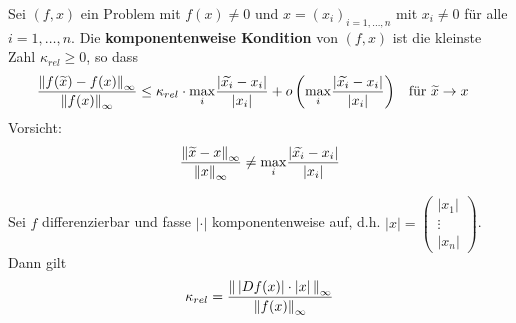 \begin{Defe}
  Sei $(f, x) $ ein Problem mit $f(x)\neq 0$ und $x=(x_i)_{i=1,\ldots , n}$ mit $x_i\neq 0 $  für alle $i=1,\ldots, n$.
  Die \textbf{komponentenweise Kondition} von $(f,x) $ ist die kleinste Zahl $\kappa_{rel}\geq 0$, so dass
  \begin{align*}
    \frac{\left\| f(\widetilde{x})-f(x) \right\|_\infty}{\left\| f(x) \right\|_\infty} 
    &\leq \kappa_{rel} \cdot \underset{i}{\max}\frac{|\widetilde{x_i}-x_i|}{|x_i|}+ o\left(\underset{i}{\max}\frac{|\widetilde{x_i}-x_i|}{|x_i|}\right) 
    && \text{für }\widetilde{x}\rightarrow x
  \end{align*}
  Vorsicht:
  \begin{gather*}
    \frac{\left\| \widetilde{x}-x \right\|_\infty}{\left\| x \right\|_\infty}\neq \underset{i}{\max}\frac{|\widetilde{x_i}-x_i|}{|x_i|}
  \end{gather*}
\end{Defe}

\begin{Leme}
  \label{3.2.17}
  Sei $f$ differenzierbar und fasse $|\cdot|$ komponentenweise auf, d.h. $|x| = \begin{pmatrix}
    |x_1| \\
    \vdots \\
    |x_n|
  \end{pmatrix}$.
  Dann gilt
  \begin{gather}
    \kappa_{rel} = \frac{\left\| \, |Df(x)|\cdot |x| \,  \right\|_\infty}{\left\| f(x) \right\|_\infty} \label{III.2.16}
  \end{gather}
\end{Leme}

